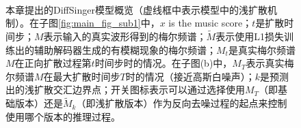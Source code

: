 \begin{figure}[htbp]
    \centering
     \\
    \caption{本章提出的DiffSinger模型概览（虚线框中表示模型中的浅扩散机制）。在子图\ref{fig:main_fig_sub1}中，$x$ is the music score；$t$是扩散时间步；$M$表示输入的真实波形得到的梅尔频谱；$\widetilde{M}$表示使用L1损失训练出的辅助解码器生成的有模糊现象的梅尔频谱；$M_t$是真实梅尔频谱$M$在正向扩散过程第$t$时间步时的情况。在子图(b)中，$M_T$表示真实梅尔频谱$M$在最大扩散时间步$T$时的情况（接近高斯白噪声）；$k$是预测出的浅扩散交汇边界点；开关图标表示可以通过选择使用$M_T$（即基础版本）还是$\widetilde{M}_k$（即浅扩散版本）作为反向去噪过程的起点来控制使用哪个版本的推理过程。}
    \label{fig:main_fig}
\end{figure}
